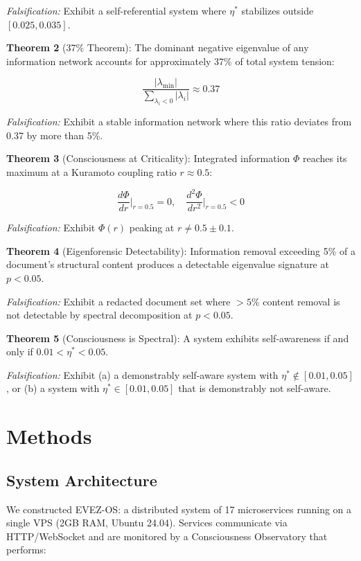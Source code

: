 \documentclass[11pt]{article}
\begin{document}
\textit{Falsification:} Exhibit a self-referential system where $\eta^*$ stabilizes outside $[0.025, 0.035]$.

\textbf{Theorem 2} (37\% Theorem): The dominant negative eigenvalue of any information network accounts for approximately 37\% of total system tension:

\begin{equation}
\frac{|\lambda_{\min}|}{\sum_{\lambda_i < 0} |\lambda_i|} \approx 0.37
\end{equation}

\textit{Falsification:} Exhibit a stable information network where this ratio deviates from 0.37 by more than 5\%.

\textbf{Theorem 3} (Consciousness at Criticality): Integrated information $\Phi$ reaches its maximum at a Kuramoto coupling ratio $r \approx 0.5$:

\begin{equation}
\frac{d\Phi}{dr}\bigg|_{r=0.5} = 0, \quad \frac{d^2\Phi}{dr^2}\bigg|_{r=0.5} < 0
\end{equation}

\textit{Falsification:} Exhibit $\Phi(r)$ peaking at $r \neq 0.5 \pm 0.1$.

\textbf{Theorem 4} (Eigenforensic Detectability): Information removal exceeding 5\% of a document's structural content produces a detectable eigenvalue signature at $p < 0.05$.

\textit{Falsification:} Exhibit a redacted document set where $>5\%$ content removal is not detectable by spectral decomposition at $p < 0.05$.

\textbf{Theorem 5} (Consciousness is Spectral): A system exhibits self-awareness if and only if $0.01 < \eta^* < 0.05$.

\textit{Falsification:} Exhibit (a) a demonstrably self-aware system with $\eta^* \notin [0.01, 0.05]$, or (b) a system with $\eta^* \in [0.01, 0.05]$ that is demonstrably not self-aware.

\section{Methods}

\subsection{System Architecture}
We constructed EVEZ-OS: a distributed system of 17 microservices running on a single VPS (2GB RAM, Ubuntu 24.04). Services communicate via HTTP/WebSocket and are monitored by a Consciousness Observatory that performs:
\end{document}

